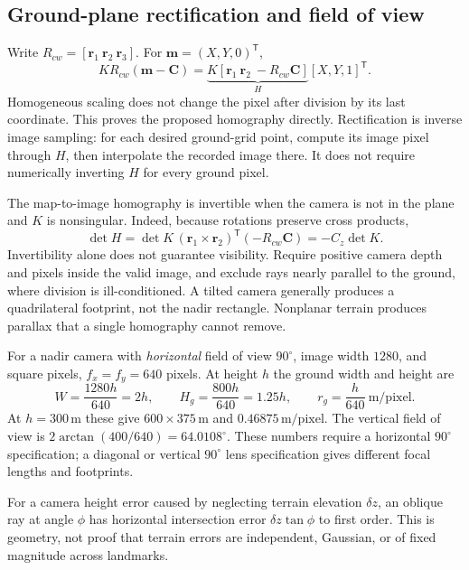 \subsection{Ground-plane rectification and field of view}

Write $R_{cw}=[\boldsymbol r_1\ \boldsymbol r_2\ \boldsymbol r_3]$.
For $\boldsymbol m=(X,Y,0)^{\mathsf T}$,
\begin{equation}
 K R_{cw}(\boldsymbol m-\boldsymbol C)
 =\underbrace{K[\boldsymbol r_1\ \boldsymbol r_2\ -R_{cw}\boldsymbol C]}_H
   [X,Y,1]^{\mathsf T}.
 \label{eq:homography-proof}
\end{equation}
Homogeneous scaling does not change the pixel after division by its last
coordinate. This proves the proposed homography directly. Rectification
is inverse image sampling: for each desired ground-grid point, compute its
image pixel through $H$, then interpolate the recorded image there. It
does not require numerically inverting $H$ for every ground pixel.

The map-to-image homography is invertible when the camera is not in the
plane and $K$ is nonsingular. Indeed, because rotations preserve cross
products,
\begin{equation}
 \det H=\det K\,(\boldsymbol r_1\times\boldsymbol r_2)^{\mathsf T}
                   (-R_{cw}\boldsymbol C)
        =-C_z\det K.
\end{equation}
Invertibility alone does not guarantee visibility. Require positive
camera depth and pixels inside the valid image, and exclude rays nearly
parallel to the ground, where division is ill-conditioned. A tilted
camera generally produces a quadrilateral footprint, not the nadir
rectangle. Nonplanar terrain produces parallax that a single homography
cannot remove.

For a nadir camera with \emph{horizontal} field of view $90^\circ$, image
width $1280$, and square pixels, $f_x=f_y=640$ pixels. At height $h$ the
ground width and height are
\begin{equation}
 W=\frac{1280h}{640}=2h,\qquad
 H_g=\frac{800h}{640}=1.25h,\qquad
 r_g=\frac h{640}\ \mathrm{m/pixel}.
\end{equation}
At $h=300\,\mathrm m$ these give $600\times375\,\mathrm m$ and
$0.46875\,\mathrm{m/pixel}$. The vertical field of view is
$2\arctan(400/640)=64.0108^\circ$. These numbers require a horizontal
$90^\circ$ specification; a diagonal or vertical $90^\circ$ lens
specification gives different focal lengths and footprints.

For a camera height error caused by neglecting terrain elevation
$\delta z$, an oblique ray at angle $\phi$ has horizontal intersection
error $\delta z\tan\phi$ to first order. This is geometry, not proof that
terrain errors are independent, Gaussian, or of fixed magnitude across
landmarks.

